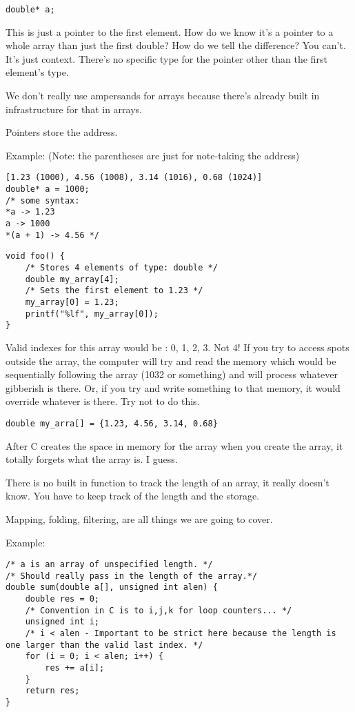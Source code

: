 \documentclass[12pt]{article}
\theoremstyle{definition}
\begin{document}
\begin{lstlisting}
double* a;
\end{lstlisting}
This is just a pointer to the first element. How do we know it's a pointer to a whole array than just the first double? How do we tell the difference? You can't. It's just context. There's no specific type for the pointer other than the first element's type.

\note We don't really use ampersands for arrays because there's already built in infrastructure for that in arrays. 

Pointers store the address. 

Example: (Note: the parentheses are just for note-taking the address)
\begin{lstlisting}
[1.23 (1000), 4.56 (1008), 3.14 (1016), 0.68 (1024)]
double* a = 1000;
/* some syntax: 
*a -> 1.23
a -> 1000
*(a + 1) -> 4.56 */
\end{lstlisting}

\begin{lstlisting}
void foo() {
    /* Stores 4 elements of type: double */
    double my_array[4];
    /* Sets the first element to 1.23 */
    my_array[0] = 1.23;
    printf("%lf", my_array[0]);
} 
\end{lstlisting}
\note Valid indexes for this array would be : 0, 1, 2, 3. Not 4! If you try to access spots outside the array, the computer will try and read the memory which would be sequentially following the array (1032 or something) and will process whatever gibberish is there. Or, if you try and write something to that memory, it would override whatever is there. Try not to do this. 

\begin{lstlisting}
double my_arra[] = {1.23, 4.56, 3.14, 0.68}
\end{lstlisting}
After C creates the space in memory for the array when you create the array, it totally forgets what the array is. I guess. 

\note There is no built in function to track the length of an array, it really doesn't know. You have to keep track of the length and the storage. 

Mapping, folding, filtering, are all things we are going to cover. 

Example:

\begin{lstlisting}
/* a is an array of unspecified length. */
/* Should really pass in the length of the array.*/
double sum(double a[], unsigned int alen) {
    double res = 0;
    /* Convention in C is to i,j,k for loop counters... */
    unsigned int i;
    /* i < alen - Important to be strict here because the length is one larger than the valid last index. */
    for (i = 0; i < alen; i++) {
        res += a[i];
    }
    return res;
}
\end{lstlisting}
\end{document}
